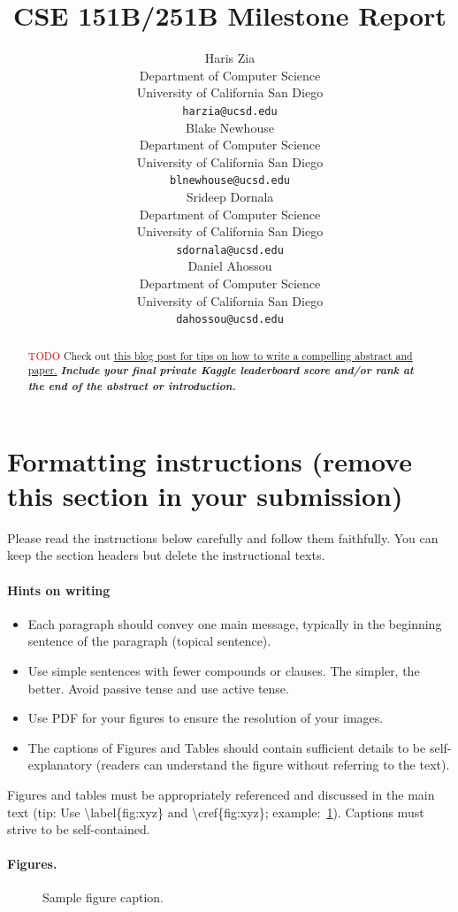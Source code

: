 \documentclass{article}
\title{
CSE 151B/251B Milestone Report
\\
}
\author{%
  Haris Zia
  \\
  Department of Computer Science\\
  University of California San Diego\\
  \texttt{harzia@ucsd.edu} \\
  \And
  Blake Newhouse \\
  Department of Computer Science\\
  University of California San Diego\\
  \texttt{blnewhouse@ucsd.edu} \\
  \AND
  Srideep Dornala \\
  Department of Computer Science\\
  University of California San Diego\\
  \texttt{sdornala@ucsd.edu} \\
  \And
  Daniel Ahossou\\
  Department of Computer Science\\
  University of California San Diego\\
  \texttt{dahossou@ucsd.edu} \\
}
\begin{document}
\maketitle


\begin{abstract}
\textcolor{red}{TODO} Check out \href{https://www.alignmentforum.org/posts/eJGptPbbFPZGLpjsp/highly-opinionated-advice-on-how-to-write-ml-papers#Abstract}{this blog post for tips on how to write a compelling abstract and paper.} \textbf{\textit{Include your final private Kaggle leaderboard score and/or rank at the end of the abstract or introduction.}}
\end{abstract}

\section*{Formatting instructions (remove this section in your submission)}
Please read the instructions below carefully and follow them faithfully. You can keep the section headers but delete the instructional texts.
\paragraph{Hints on writing}
\begin{itemize}
    \item Each paragraph should convey one main message, typically in the beginning sentence of the paragraph (topical sentence).
    \item  Use simple sentences with fewer compounds or clauses. The simpler, the better. Avoid passive tense and use active tense.
    \item Use PDF for your figures to ensure the resolution of your images.
    \item The captions of Figures and Tables should contain sufficient details to be self-explanatory (readers can understand the figure without referring to the text).
\end{itemize}


Figures and tables must be appropriately referenced and discussed in the main text (tip: Use \textbackslash label\{fig:xyz\} and \textbackslash cref\{fig:xyz\}; example:~\cref{fig:example}). Captions must strive to be self-contained.
\paragraph{Figures.}
\begin{figure} %
  \vspace{-4mm}  %
  \centering
  \fbox{\rule[-.5cm]{0cm}{4cm} \rule[-.5cm]{4cm}{0cm}}
  \caption{Sample figure caption.}
  \label{fig:example}
\end{figure}
\end{document}
